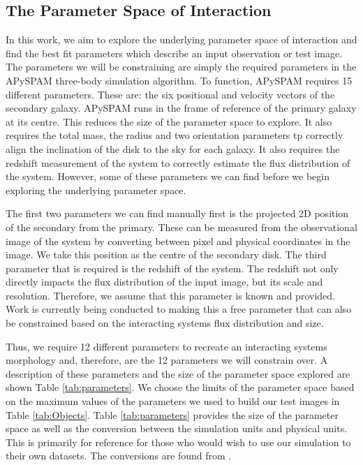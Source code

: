 \subsection{The Parameter Space of Interaction}
In this work, we aim to explore the underlying parameter space of interaction and find the best fit parameters which describe an input observation or test image. The parameters we will be constraining are simply the required parameters in the APySPAM three-body simulation algorithm. To function, APySPAM requires 15 different parameters. These are: the six positional and velocity vectors of the secondary galaxy. APySPAM runs in the frame of reference of the primary galaxy at its centre. This reduces the size of the parameter space to explore. It also requires the total mass, the radius and two orientation parameters tp correctly align the inclination of the disk to the sky for each galaxy. It also requires the redshift measurement of the system to correctly estimate the flux distribution of the system. However, some of these parameters we can find before we begin exploring the underlying parameter space.

The first two parameters we can find manually first is the projected 2D position of the secondary from the primary. These can be measured from the observational image of the system by converting between pixel and physical coordinates in the image. We take this position as the centre of the secondary disk. The third parameter that is required is the redshift of the system. The redshift not only directly impacts the flux distribution of the input image, but its scale and resolution. Therefore, we assume that this parameter is known and provided. Work is currently being conducted to making this a free parameter that can also be constrained based on the interacting systems flux distribution and size.

Thus, we require 12 different parameters to recreate an interacting systems morphology and, therefore, are the 12 parameters we will constrain over. A description of these parameters and the size of the parameter space explored are shown Table \ref{tab:parameters}. We choose the limits of the parameter space based on the maximum values of the parameters we used to build our test images in Table \ref{tab:Objects}. Table \ref{tab:parameters} provides the size of the parameter space as well as the conversion between the simulation units and physical units. This is primarily for reference for those who would wish to use our simulation to their own datasets. The conversions are found from \citet{1990AJ....100.1477W}.

